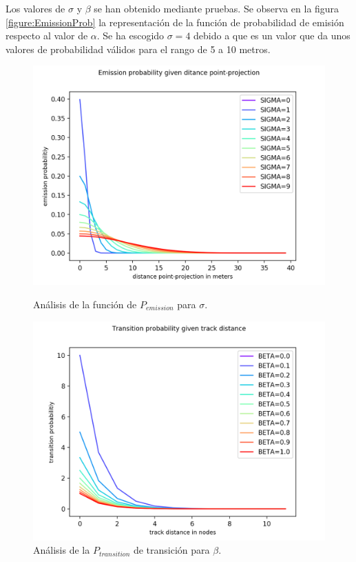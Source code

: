 Los valores de $\sigma$ y $\beta$ se han obtenido mediante pruebas. Se observa en la figura \ref{figure:EmissionProb} la representación de la función de probabilidad de emisión respecto al valor de $\alpha$. Se ha escogido $\sigma = 4$ debido a que es un valor que da unos valores de 
probabilidad válidos para el rango de 5 a 10 metros. 

\begin{figure}[!htb]
\begin{minipage}{0.46\textwidth}
\centering
\includegraphics[width=1.2\textwidth]{./Imagenes/EmissionProb.png}
\caption{Análisis de la función de $P_{emission}$ para $\sigma$.}
\label{figure:EmissionProb}
\end{minipage}\hfill
\begin{minipage}{0.46\textwidth}
\centering
\includegraphics[width=1.2\textwidth]{./Imagenes/TransitionProb.png}
\caption{Análisis de la $P_{transition}$ de transición para $\beta$.}
\label{figure:TransitionProb}
\end{minipage}
\end{figure}

